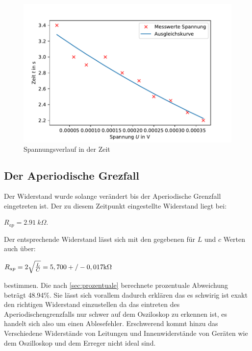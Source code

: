 \begin{figure}
    \centering
    \includegraphics{spannungsverlauf.pdf}
    \caption{Spannungsverlauf in der Zeit}
    \label{fig:bild1}
  \end{figure}

  \subsection{Der Aperiodische Grezfall}
  \label{sec:apg}
  Der Widerstand wurde solange verändert bis der Aperiodische Grenzfall eingetreten ist. Der zu diesem 
  Zeitpunkt eingestellte Widerstand liegt bei:
  \begin{center}
      $R_{ap}=\SI[]{2.91}[]{k\Omega}$.\\
  \end{center}
  Der entsprechende Widerstand lässt sich mit den gegebenen für $L$ und $c$ Werten auch über:
  \begin{center}
      $R_{ap}=2\sqrt{\frac{L}{C}}=5,700+/-0,017\si[]{k\Omega}$
  \end{center}
  bestimmen. Die nach \autoref{sec:prozentuale} berechnete prozentuale Abweichung beträgt 48.94\%.
  Sie lässt sich vorallem dadurch erklären das es schwirig ist exakt den richtigen Widerstand 
  einzustellen da das eintreten des Aperiodischengrenzfalls nur schwer auf dem Osziloskop zu erkennen  ist,
  es handelt sich also um einen Ablesefehler. Erschwerend kommt hinzu das Verschiedene Widerstände von Leitungen
  und Innenwiderstände von Geräten wie dem Oszilloskop und dem Erreger nicht ideal sind.

